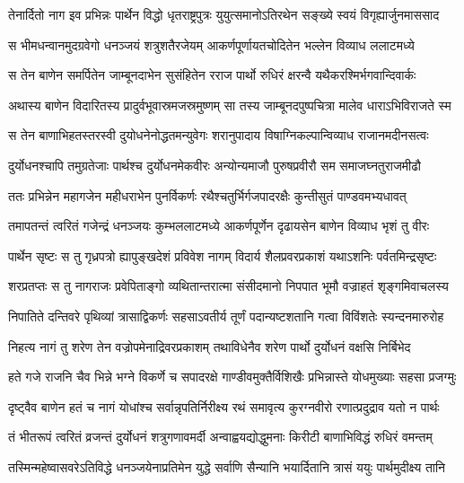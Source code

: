 \twolineshloka
{तेनार्दितो नाग इव प्रभिन्नः पार्थेन विद्धो धृतराष्ट्रपुत्रः}
{युयुत्समानोऽतिरथेन सङ्ख्ये स्वयं विगृह्यार्जुनमाससाद}


\twolineshloka
{स भीमधन्वानमुदग्रवेगो धनञ्जयं शत्रुशतैरजेयम्}
{आकर्णपूर्णायतचोदितेन भल्लेन विव्याध ललाटमध्ये}


\twolineshloka
{स तेन बाणेन समर्पितेन जाम्बूनदाभेन सुसंहितेन}
{रराज पार्थो रुधिरं क्षरन्वै यथैकरश्मिर्भगवान्दिवार्कः}


\twolineshloka
{अथास्य बाणेन विदारितस्य प्रादुर्वभूवास्रमजस्रमुष्णम्}
{सा तस्य जाम्बूनदपुष्पचित्रा मालेव धाराऽभिविराजते स्म}


\twolineshloka
{स तेन बाणाभिहतस्तरस्वी दुयोधनेनोद्धतमन्युवेगः}
{शरानुपादाय विषाग्निकल्पान्विव्याध राजानमदीनसत्वः}


\twolineshloka
{दुर्योधनश्चापि तमुग्रतेजाः पार्थश्च दुर्योधनमेकवीरः}
{अन्योन्यमाजौ पुरुषप्रवीरौ सम समाजघ्नतुराजमीढौ}


\twolineshloka
{ततः प्रभिन्नेन महागजेन महीधराभेन पुनर्विकर्णः}
{रथैश्चतुर्भिर्गजपादरक्षैः कुन्तीसुतं पाण्डवमभ्यधावत्}


\twolineshloka
{तमापतन्तं त्वरितं गजेन्द्रं धनञ्जयः कुम्भललाटमध्ये}
{आकर्णपूर्णेन दृढायसेन बाणेन विव्याध भृशं तु वीरः}


\twolineshloka
{पार्थेन सृष्टः स तु गृध्रपत्रो ह्यापुङ्खदेशं प्रविवेश नागम्}
{विदार्य शैलप्रवरप्रकाशं यथाऽशनिः पर्वतमिन्द्रसृष्टः}


\twolineshloka
{शरप्रतप्तः स तु नागराजः प्रवेपिताङ्गो व्यथितान्तरात्मा}
{संसीदमानो निपपात भूमौ वज्राहतं शृङ्गमिवाचलस्य}


\twolineshloka
{निपातिते दन्तिवरे पृथिव्यां त्रासाद्विकर्णः सहसाऽवतीर्य}
{तूर्णं पदान्यष्टशतानि गत्वा विविंशतेः स्यन्दनमारुरोह}


\twolineshloka
{निहत्य नागं तु शरेण तेन वज्रोपमेनाद्रिवरप्रकाशम्}
{तथाविधेनैव शरेण पार्थो दुर्योधनं वक्षसि निर्बिभेद}


\twolineshloka
{हते गजे राजनि चैव भिन्ने भग्ने विकर्णे च सपादरक्षे}
{गाण्डीवमुक्तैर्विशिखैः प्रभिन्नास्ते योधमुख्याः सहसा प्रजग्मुः}


\twolineshloka
{दृष्ट्वैव बाणेन हतं च नागं योधांश्च सर्वान्नृपतिर्निरीक्ष्य}
{रथं समावृत्य कुरग्नवीरो रणात्प्रदुद्राव यतो न पार्थः}


\twolineshloka
{तं भीतरूपं त्वरितं व्रजन्तं दुर्योधनं शत्रुगणावमर्दी}
{अन्वाह्वयद्योद्धुमनाः किरीटी बाणाभिविद्धं रुधिरं वमन्तम्}


\twolineshloka
{तस्मिन्महेष्वासवरेऽतिविद्धे धनञ्जयेनाप्रतिमेन युद्धे}
{सर्वाणि सैन्यानि भयार्दितानि त्रासं ययुः पार्थमुदीक्ष्य तानि}


